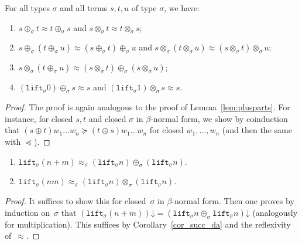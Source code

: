 \documentclass[a4paper,UKenglish,cleveref,autoref,numberwithinsect]{lipics-v2019}
\theoremstyle{definition}
\newcommand{\lift}{\mathtt{lift}}
\newcommand{\da}{\mathord{\downarrow}}
\begin{document}
{ \renewcommand{\thelemma}{\ref{lem:approxproperties}}
\begin{lemma}
For all types $\sigma$ and all terms $s,t,u$ of type $\sigma$, we
have:
\begin{enumerate}
\item $s \oplus_\sigma t \approx t \oplus_\sigma s$ and $s
  \otimes_\sigma t \approx t \otimes_\sigma s$;
\item $s \oplus_\sigma (t \oplus_\sigma u) \approx (s \oplus_\sigma t)
  \oplus_\sigma u$ and $s \otimes_\sigma (t \otimes_\sigma u) \approx
  (s \otimes_\sigma t) \otimes_\sigma u$;
\item $s \otimes_\sigma (t \oplus_\sigma u) \approx (s \otimes_\sigma
  t) \oplus_\sigma (s \otimes_\sigma u)$;
\item $(\lift_\sigma 0) \oplus_\sigma s \approx s$ and $(\lift_\sigma
  1) \otimes_\sigma s \approx s$.
\end{enumerate}
\end{lemma}
\addtocounter{theorem}{-1}}

\begin{proof}
  The proof is again analogous to the proof of
  Lemma~\ref{lem:plusparts}. For instance, for closed $s,t$ and closed
  $\sigma$ in $\beta$-normal form, we show by coinduction that $(s
  \oplus t) w_1 \ldots w_n \succeq (t \oplus s) w_1 \ldots w_n$ for
  closed $w_1,\ldots,w_n$ (and then the same with $\preceq$).
\end{proof}

{ \renewcommand{\thelemma}{\ref{lem_lift_approx}}
\begin{lemma}
  \begin{enumerate}
  \item $\lift_\sigma(n+m) \approx_\sigma (\lift_\sigma n)
    \oplus_\sigma (\lift_\sigma n)$.
  \item $\lift_\sigma(n m) \approx_\sigma (\lift_\sigma n)
    \otimes_\sigma (\lift_\sigma n)$.
  \end{enumerate}
\end{lemma}
\addtocounter{theorem}{-1}}

\begin{proof}
  It suffices to show this for closed~$\sigma$ in $\beta$-normal
  form. Then one proves by induction on~$\sigma$ that
  $(\lift_\sigma(n+m))\da = (\lift_\sigma n \oplus_\sigma \lift_\sigma
  n)\da$ (analogously for multiplication). This suffices by
  Corollary~\ref{cor_succ_da} and the reflexivity of~$\approx$.
\end{proof}
\end{document}
